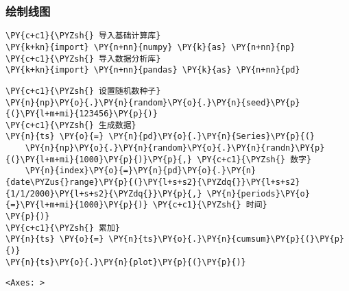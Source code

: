     \hypertarget{ux7ed8ux5236ux7ebfux56fe}{%
\subsubsection{绘制线图}\label{ux7ed8ux5236ux7ebfux56fe}}

    \begin{tcolorbox}[breakable, size=fbox, boxrule=1pt, pad at break*=1mm,colback=cellbackground, colframe=cellborder]
\begin{Verbatim}[commandchars=\\\{\}]
\PY{c+c1}{\PYZsh{} 导入基础计算库}
\PY{k+kn}{import} \PY{n+nn}{numpy} \PY{k}{as} \PY{n+nn}{np}
\PY{c+c1}{\PYZsh{} 导入数据分析库}
\PY{k+kn}{import} \PY{n+nn}{pandas} \PY{k}{as} \PY{n+nn}{pd}
\end{Verbatim}
\end{tcolorbox}

    \begin{tcolorbox}[breakable, size=fbox, boxrule=1pt, pad at break*=1mm,colback=cellbackground, colframe=cellborder]
\begin{Verbatim}[commandchars=\\\{\}]
\PY{c+c1}{\PYZsh{} 设置随机数种子}
\PY{n}{np}\PY{o}{.}\PY{n}{random}\PY{o}{.}\PY{n}{seed}\PY{p}{(}\PY{l+m+mi}{123456}\PY{p}{)}
\PY{c+c1}{\PYZsh{} 生成数据}
\PY{n}{ts} \PY{o}{=} \PY{n}{pd}\PY{o}{.}\PY{n}{Series}\PY{p}{(}
    \PY{n}{np}\PY{o}{.}\PY{n}{random}\PY{o}{.}\PY{n}{randn}\PY{p}{(}\PY{l+m+mi}{1000}\PY{p}{)}\PY{p}{,} \PY{c+c1}{\PYZsh{} 数字}
    \PY{n}{index}\PY{o}{=}\PY{n}{pd}\PY{o}{.}\PY{n}{date\PYZus{}range}\PY{p}{(}\PY{l+s+s2}{\PYZdq{}}\PY{l+s+s2}{1/1/2000}\PY{l+s+s2}{\PYZdq{}}\PY{p}{,} \PY{n}{periods}\PY{o}{=}\PY{l+m+mi}{1000}\PY{p}{)} \PY{c+c1}{\PYZsh{} 时间}
\PY{p}{)}
\PY{c+c1}{\PYZsh{} 累加}
\PY{n}{ts} \PY{o}{=} \PY{n}{ts}\PY{o}{.}\PY{n}{cumsum}\PY{p}{(}\PY{p}{)}
\PY{n}{ts}\PY{o}{.}\PY{n}{plot}\PY{p}{(}\PY{p}{)}
\end{Verbatim}
\end{tcolorbox}

            \begin{tcolorbox}[breakable, size=fbox, boxrule=.5pt, pad at break*=1mm, opacityfill=0]
\begin{Verbatim}[commandchars=\\\{\}]
<Axes: >
\end{Verbatim}
\end{tcolorbox}
        
    \begin{center}
    \end{center}
    { \hspace*{\fill} \\}
